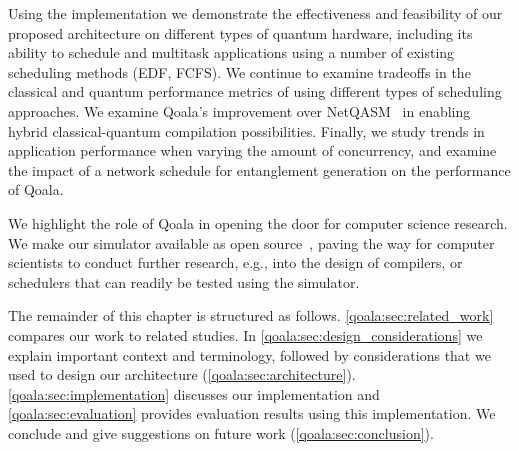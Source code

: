 Using the implementation we demonstrate the effectiveness and feasibility of our proposed architecture on different types of quantum hardware, including its ability to schedule and multitask applications using a number of existing scheduling methods (EDF, FCFS).
We continue to examine tradeoffs in the classical and quantum performance metrics of using different types of scheduling approaches. 
We examine Qoala's improvement over NetQASM~\cite{dahlberg2022netqasm} in enabling hybrid classical-quantum compilation possibilities. 
Finally, we study trends in application performance when varying the amount of concurrency, and examine the impact of a network schedule for entanglement generation on the performance of Qoala.

We highlight the role of Qoala in opening the door for computer science research. We make our simulator available as open source~\cite{qoala2023simulator}, paving the way for computer scientists to conduct further research, e.g., into the design of compilers, or schedulers that can readily be tested using the simulator. 

The remainder of this chapter is structured as follows. \cref{qoala:sec:related_work} compares our work to related studies. In \cref{qoala:sec:design_considerations} we explain important context and terminology, followed by considerations that we used to design our architecture (\cref{qoala:sec:architecture}). \cref{qoala:sec:implementation} discusses our implementation and \cref{qoala:sec:evaluation} provides evaluation results using this implementation. We conclude and give suggestions on future work (\cref{qoala:sec:conclusion}).

